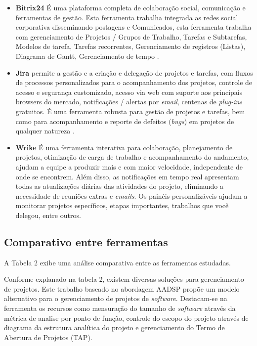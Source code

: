 \documentclass{acm_proc_article-sp}
\begin{document}
\begin{itemize}
\item \textbf{Bitrix24} É uma plataforma completa de colaboração social, comunicação e ferramentas de gestão. Esta ferramenta trabalha integrada as redes social corporativa disseminando postagens e Comunicados, esta ferramenta trabalha com gerenciamento de Projetos / Grupos de Trabalho, Tarefas e Subtarefas, Modelos de tarefa, Tarefas recorrentes, Gerenciamento de registros (Listas), Diagrama de Gantt, Gerenciamento de tempo \cite{bitrix24:ferramenta}.
\item \textbf{Jira}  permite a gestão e a criação e delegação de projetos e tarefas, com fluxos de processos personalizados para o acompanhamento dos projetos, controle de acesso e segurança customizado, acesso via web com suporte aos principais browsers do mercado, notificações / alertas por \textit{email},  centenas de \textit{plug-ins} gratuitos. É uma ferramenta robusta para gestão de projetos e tarefas, bem como para acompanhamento e reporte de defeitos (\textit{bugs}) em projetos de qualquer natureza \cite{jira:ferramenta}.
\item \textbf{Wrike} É uma ferramenta interativa para colaboração, planejamento de projetos, otimização de carga de trabalho e acompanhamento do andamento, ajudam a equipe a produzir mais e com maior velocidade, independente de onde se encontrem. Além disso, as notificações em tempo real apresentam todas as atualizações diárias das atividades do projeto, eliminando a necessidade de reuniões extras e \textit{emails}. Os painéis personalizáveis ajudam a monitorar projetos específicos, etapas importantes, trabalhos que você delegou, entre outros.  
\end{itemize}

\subsection{Comparativo entre ferramentas}
 A Tabela 2 exibe uma análise comparativa entre as ferramentas estudadas.

Conforme explanado na tabela 2, existem diversas soluções para gerenciamento de projetos. Este trabalho baseado no abordagem AADSP propõe um modelo alternativo para o gerenciamento de projetos de \textit{software}. Destacam-se na ferramenta os recursos como mensuração do tamanho de \textit{software} através da métrica de analise por ponto de função, controle do escopo do projeto através de diagrama da estrutura analítica do projeto e gerenciamento do Termo de Abertura de Projetos (TAP). 
\end{document}
